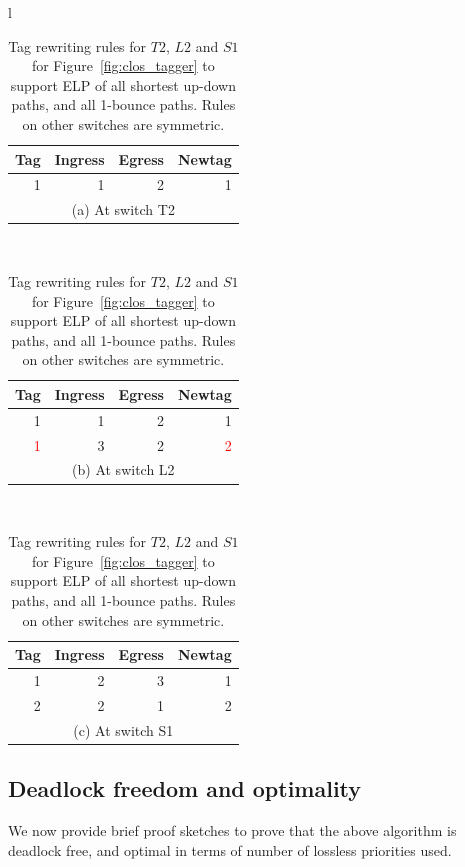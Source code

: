 \begin{table}[t]
		\centering
		\footnotesize
		\begin{tabular}{l}
		\begin{tabular}{|r|r|r|r|}
			\hline
			Tag&  Ingress& Egress & Newtag \\
			\hline
			\hline
			1 & 1 & 2 & 1 \\
			\hline
			\multicolumn{4}{c}{(a) At switch T2} \\
		\end{tabular}
		\\
		\begin{tabular}{|r|r|r|r|}
			\hline
			Tag&  Ingress& Egress & Newtag \\
			\hline
			\hline
			1 & 1 & 2 & 1 \\
			\hline
			\textcolor{red}{1} & 3 & 2 & \textcolor{red}{2} \\
			\hline
			\multicolumn{4}{c}{(b) At switch L2} \\
		\end{tabular}
		\\
		
		\begin{tabular}{|r|r|r|r|}
			\hline
			Tag&  Ingress& Egress & Newtag \\
			\hline
			\hline
			1 & 2 & 3 & 1 \\
				\hline
			2 & 2 & 1 & 2 \\
			\hline
			\multicolumn{4}{c}{(c) At switch S1} \\
		\end{tabular}
		
	\end{tabular}
		\caption{Tag rewriting rules for $T2$, $L2$ and $S1$ for Figure~\ref{fig:clos_tagger} to support
		ELP of all shortest up-down paths, and all 1-bounce paths. Rules on other
		switches are symmetric.}
		\label{tab:clos_tag_rules}
		\vspace{-1em}
\end{table}

\subsection {Deadlock freedom and optimality}
\label{subsec:specific_deadlock_free}

We now provide brief proof sketches to prove that the above algorithm is
deadlock free, and optimal in terms of number of lossless priorities used.


